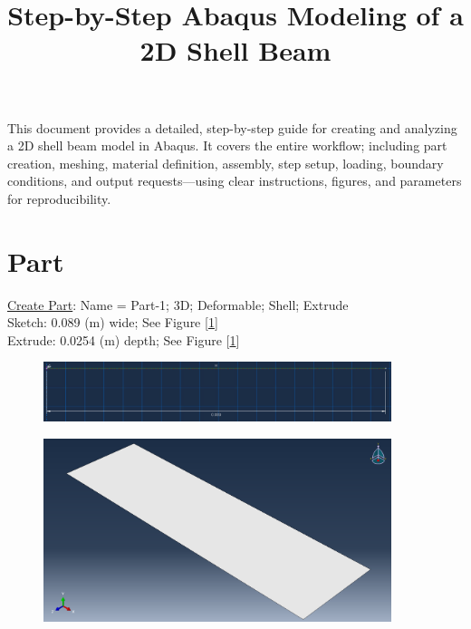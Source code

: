 \documentclass{article}
\begin{document}
	
	\title{Step-by-Step Abaqus Modeling of a 2D Shell Beam}
	\author{}
	\date{}
	\maketitle
	
	This document provides a detailed, step-by-step guide for creating and analyzing a 2D shell beam model in Abaqus. It covers the entire workflow; including part creation, meshing, material definition, assembly, step setup, loading, boundary conditions, and output requests—using clear instructions, figures, and parameters for reproducibility.
	
	\section{Part}
	\underline{Create Part}: Name  =  Part-1; 3D; Deformable; Shell; Extrude\\
	Sketch: 0.089 (m) wide; See Figure [\ref{fig:extsketch}]\\
	Extrude: 0.0254 (m) depth; See Figure [\ref{fig:extsketch}]
	\begin{figure}[H]
		\centering
		\includegraphics[width =4in]{Figures/shell_extrude_sketch.png}
		\caption{}
		\label{fig:extsketch}
	\end{figure}
	\begin{figure}[H]
		\centering
		\includegraphics[width=4in]{Figures/shell_extrude.png}
		\caption{}
		\label{fig:ext}
	\end{figure}
	
\end{document}
